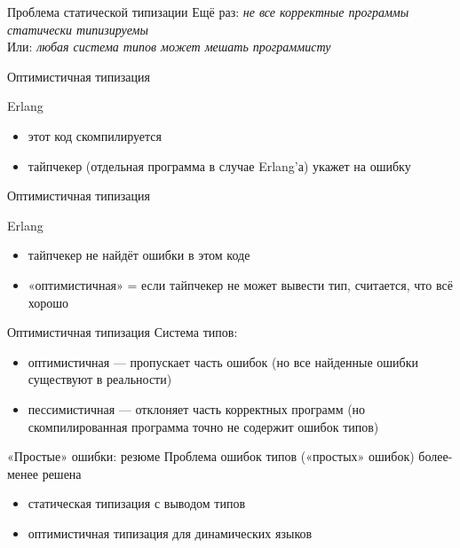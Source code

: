 \documentclass[10pt]{beamer}
\begin{document}
\begin{frame}{Проблема статической типизации}
  Ещё раз: \emph{не все корректные программы статически типизируемы}\vspace{2em}\\
  Или: \emph{любая система типов может мешать программисту}
\end{frame}

\begin{frame}{Оптимистичная типизация}
  \begin{block}{Erlang}
    \centering
    \small
    \lstset{language=erlang}
    
  \end{block}
  \begin{itemize}
  \item этот код скомпилируется
  \item тайпчекер (отдельная программа в случае Erlang'а) укажет на ошибку
  \end{itemize}
\end{frame}

\begin{frame}{Оптимистичная типизация}
  \begin{block}{Erlang}
    \centering
    \small
    \lstset{language=erlang}
    
  \end{block}
  \begin{itemize}
  \item тайпчекер не найдёт ошибки в этом коде
  \item «оптимистичная» = если тайпчекер не может вывести тип, считается, что всё хорошо
  \end{itemize}
\end{frame}

\begin{frame}{Оптимистичная типизация}
  Система типов:
  \begin{itemize}
  \item оптимистичная — пропускает часть ошибок (но все найденные ошибки существуют в реальности)
  \item пессимистичная — отклоняет часть корректных программ (но скомпилированная программа точно не содержит ошибок типов)
  \end{itemize}
\end{frame}

\begin{frame}{«Простые» ошибки: резюме}
  Проблема ошибок типов («простых» ошибок) более-менее решена
  \begin{itemize}
  \item статическая типизация с выводом типов
  \item оптимистичная типизация для динамических языков
  \end{itemize}
\end{frame}
\end{document}
